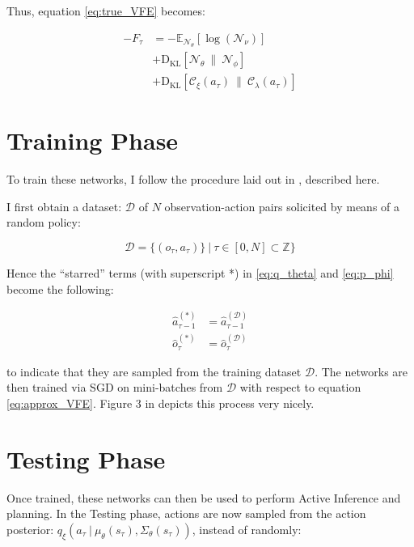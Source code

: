 \documentclass{article}
\begin{document}
Thus, equation \ref{eq:true_VFE} becomes:

\begin{equation}
    \begin{aligned}
        \label{eq:approx_VFE}
        -F_{\tau} &= -\mathbb{E}_{\mathcal{N}_{\theta}}[\log{(\mathcal{N}_{\nu})}] \\
        &+ \text{D}_{\text{KL}}[\mathcal{N}_{\theta} \ \| \ \mathcal{N}_{\phi}] \\
        &+ \text{D}_{\text{KL}}[\mathcal{C}_{\xi}(a_{\tau}) \ \| \ \mathcal{C}_{\lambda}(a_{\tau})]
    \end{aligned}
\end{equation}


\section{Training Phase}
\label{sec:training_phase}
To train these networks, I follow the procedure laid out in \cite{learn_gen_ssm_aif}, described here.

I first obtain a dataset: $\mathcal{D}$ of $N$ observation-action pairs solicited by means of a random policy:

\begin{equation}
    \label{eq:data_D}
    \mathcal{D} = \{(o_{\tau}, a_{\tau})\} \ | \ \tau \in [0, N] \subset \mathbb{Z} \}
\end{equation}

Hence the ``starred'' terms (with superscript *) in \ref{eq:q_theta} and \ref{eq:p_phi} become the following:

\begin{equation}
    \begin{aligned}
        \label{eq:training_notation}
        \hat{a}_{\tau - 1}^{(*)} &= \hat{a}_{\tau - 1}^{(\mathcal{D})} \\
        \hat{o}_{\tau}^{(*)} &= \hat{o}_{\tau}^{(\mathcal{D})}
    \end{aligned}
\end{equation}

to indicate that they are sampled from the training dataset $\mathcal{D}$. The networks are then trained via SGD on mini-batches from $\mathcal{D}$ with respect to equation \ref{eq:approx_VFE}. Figure $3$ in \cite{learn_gen_ssm_aif} depicts this process very nicely. 

\section{Testing Phase}
\label{sec:testing_phase}
Once trained, these networks can then be used to perform Active Inference and planning. In the Testing phase, actions are now sampled from the action posterior: $q_{\xi}(a_{\tau} \ | \ \mu_{\theta}(s_{\tau}), \Sigma_{\theta}(s_{\tau}))$, instead of randomly:
\end{document}
